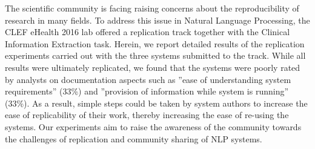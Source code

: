 The scientific community is facing raising concerns about the reproducibility of research in many fields. To address this issue in Natural Language Processing, the CLEF eHealth 2016 lab offered a replication track together with the Clinical Information Extraction task. Herein, we report detailed results of the replication experiments carried out with the three systems submitted to the track. While all results were ultimately replicated, we found that the systems were poorly rated by analysts on documentation aspects such as ''ease of understanding system requirements'' (33\%) and ''provision of information while system is running'' (33\%). As a result, simple steps could be taken by system authors to increase the ease of replicability of their work, thereby increasing the ease of re-using the systems. Our experiments aim to raise the awareness of the community towards the challenges of replication and community sharing of NLP systems.
